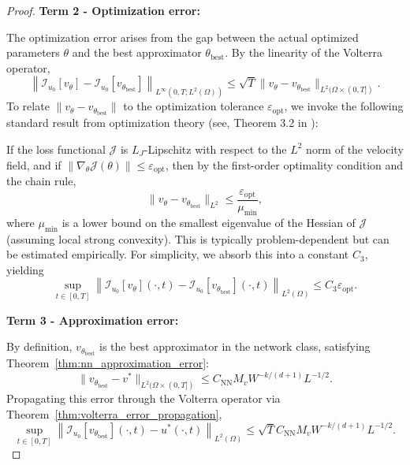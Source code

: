 \documentclass[11pt,reqno]{amsart}
\theoremstyle{plain}
\theoremstyle{definition}
\theoremstyle{remark}
\begin{document}
\begin{proof}
\medskip
\noindent\textbf{Term 2 - Optimization error:}

\noindent The optimization error arises from the gap between the actual optimized parameters $\theta$ and the best approximator $\theta_{\mathrm{best}}$. By the linearity of the Volterra operator,
\begin{equation}
    \left\| \mathcal{I}_{u_0}[v_\theta] - \mathcal{I}_{u_0}[v_{\theta_{\mathrm{best}}}] \right\|_{L^\infty(0,T; L^2(\Omega))} \leq \sqrt{T} \|v_\theta - v_{\theta_{\mathrm{best}}}\|_{L^2(\Omega \times (0,T])}.
\end{equation}
To relate $\|v_\theta - v_{\theta_{\mathrm{best}}}\|$ to the optimization tolerance $\varepsilon_{\mathrm{opt}}$, we invoke the following standard result from optimization theory (see, Theorem 3.2 in \cite{nocedal2006}):

If the loss functional $\mathcal{J}$ is $L_J$-Lipschitz with respect to the $L^2$ norm of the velocity field, and if $\|\nabla_\theta \mathcal{J}(\theta)\| \leq \varepsilon_{\mathrm{opt}}$, then by the first-order optimality condition and the chain rule,
\begin{equation}
    \|v_\theta - v_{\theta_{\mathrm{best}}}\|_{L^2} \leq \frac{\varepsilon_{\mathrm{opt}}}{\mu_{\min}},
\end{equation}
where $\mu_{\min}$ is a lower bound on the smallest eigenvalue of the Hessian of $\mathcal{J}$ (assuming local strong convexity). This is typically problem-dependent but can be estimated empirically. For simplicity, we absorb this into a constant $C_3$, yielding
\begin{equation}\label{eq:opt_error_bound}
    \sup_{t \in [0,T]} \left\| \mathcal{I}_{u_0}[v_\theta](\cdot,t) - \mathcal{I}_{u_0}[v_{\theta_{\mathrm{best}}}](\cdot,t) \right\|_{L^2(\Omega)} \leq C_3 \varepsilon_{\mathrm{opt}}.
\end{equation}

\medskip
\noindent\textbf{Term 3 - Approximation error:}

\noindent By definition, $v_{\theta_{\mathrm{best}}}$ is the best approximator in the network class, satisfying Theorem~\ref{thm:nn_approximation_error}:
\begin{equation}
    \|v_{\theta_{\mathrm{best}}} - v^*\|_{L^2(\Omega \times (0,T])} \leq C_{\mathrm{NN}} M_v W^{-k/(d+1)} L^{-1/2}.
\end{equation}
Propagating this error through the Volterra operator via Theorem~\ref{thm:volterra_error_propagation},
\begin{equation}\label{eq:approx_error_bound}
    \sup_{t \in [0,T]} \left\| \mathcal{I}_{u_0}[v_{\theta_{\mathrm{best}}}](\cdot,t) - u^*(\cdot,t) \right\|_{L^2(\Omega)} \leq \sqrt{T} C_{\mathrm{NN}} M_v W^{-k/(d+1)} L^{-1/2}.
\end{equation}


\end{proof}
\end{document}

